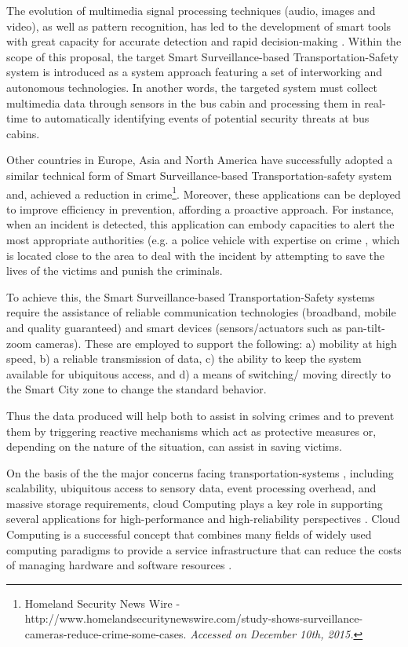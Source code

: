 The evolution of multimedia signal processing techniques (audio, images and video), as well as pattern recognition, has led to the development of smart tools with great capacity for accurate detection and rapid decision-making \cite{Schonfeld2010}. Within the scope of this proposal, the target Smart Surveillance-based Transportation-Safety system is introduced as a system approach featuring a set of interworking and autonomous technologies. In another words, the targeted system must collect multimedia data through sensors in the bus cabin and processing them in real-time to automatically identifying events of potential security threats at bus cabins.

Other countries in Europe, Asia and North America have successfully adopted a similar technical form of Smart Surveillance-based Transportation-safety system and, achieved a reduction in crime\footnote[6]{Homeland Security News Wire - http://www.homelandsecuritynewswire.com/study-shows-surveillance-cameras-reduce-crime-some-cases. \textit{Accessed on December 10th, 2015.}}. Moreover, these  applications can be deployed to improve efficiency in prevention, affording a proactive approach. For instance, when an incident is detected, this application can embody capacities to alert the most appropriate authorities (e.g. a police vehicle with expertise on crime , which is located close to the area to deal with the incident by attempting to save the lives of the victims and punish the criminals.

To achieve this, the Smart Surveillance-based Transportation-Safety systems require the assistance of reliable communication technologies (broadband, mobile and quality guaranteed) and smart devices (sensors/actuators such as pan-tilt-zoom cameras). These are employed to support the following: a) mobility at high speed, b) a reliable transmission of data, c) the ability to keep the system available for ubiquitous access, and d) a means of switching/ moving directly to the Smart City zone to change the standard behavior. 

Thus the data produced will help both to assist in solving crimes and to prevent them by triggering reactive mechanisms which act as protective measures or, depending on the nature of the situation, can assist in saving victims.

On the basis of the the major concerns facing transportation-systems \cite{Karagiannis2011}, including scalability, ubiquitous access to sensory data, event processing overhead, and massive storage requirements, cloud Computing plays a key role in supporting several applications for high-performance and high-reliability perspectives \cite{Anwar_Hossain}. Cloud Computing is a successful concept that combines many fields of widely used computing paradigms to provide a service infrastructure that can reduce the costs of managing hardware and software resources \cite{Hayes2008}. 

